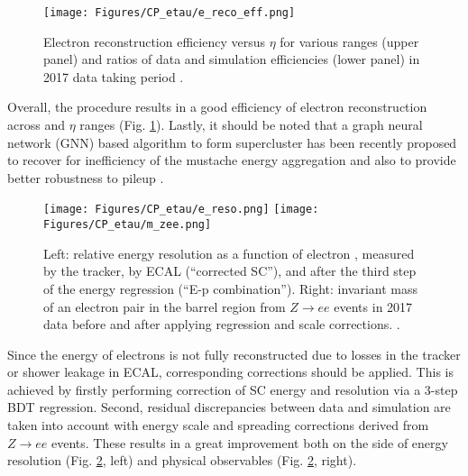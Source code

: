 \begin{figure}[t!]
    \centering
    \texttt{[image: Figures/CP\_etau/e\_reco\_eff.png]}
    \caption{Electron reconstruction efficiency versus $\eta$ for various \pt ranges (upper panel) and ratios of data and simulation efficiencies (lower panel) in 2017 data taking period \cite{CMS:2020uim}.}
    \label{fig:e-reco-eff}
\end{figure}

Overall, the procedure results in a good efficiency of electron reconstruction across \pt and $\eta$ ranges (Fig. \ref{fig:e-reco-eff}). Lastly, it should be noted that a graph neural network (GNN) based algorithm to form supercluster has been recently proposed to recover for inefficiency of the mustache energy aggregation and also to provide better robustness to pileup \cite{Valsecchi:2022rla, CMS-DP-2022-032}.

\begin{figure}[ht!]
    \centering
    \texttt{[image: Figures/CP\_etau/e\_reso.png]}
    \texttt{[image: Figures/CP\_etau/m\_zee.png]}
    \caption{Left: relative energy resolution as a function of electron \pt, measured by the tracker, by ECAL (\enquote{corrected SC}), and after the third step of the energy regression (\enquote{E-p combination}). Right: invariant mass of an electron pair in the barrel region from $Z\to ee$ events in 2017 data before and after applying regression and scale corrections. \cite{CMS:2020uim}.}
    \label{fig:e_corr}
\end{figure}

Since the energy of electrons is not fully reconstructed due to losses in the tracker or shower leakage in ECAL, corresponding corrections should be applied. This is achieved by firstly performing correction of SC energy and resolution via a 3-step BDT regression.  Second, residual discrepancies between data and simulation are taken into account with energy scale and spreading corrections derived from $Z \to ee$ events. These results in a great improvement both on the side of energy resolution (Fig. \ref{fig:e_corr}, left) and physical observables (Fig. \ref{fig:e_corr}, right).

